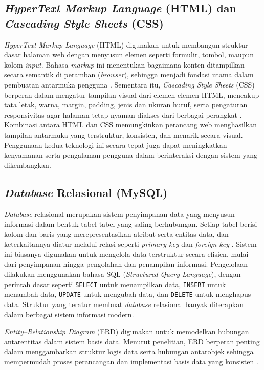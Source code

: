 \subsection{\textit{HyperText Markup Language} (HTML) dan \textit{Cascading Style Sheets} (CSS)} \label{II.HTMLCSS}
\textit{HyperText Markup Language} (HTML) digunakan untuk membangun struktur dasar halaman web dengan menyusun elemen seperti formulir, tombol, maupun kolom \textit{input}. Bahasa \textit{markup} ini menentukan bagaimana konten ditampilkan secara semantik di peramban (\textit{browser}), sehingga menjadi fondasi utama dalam pembuatan antarmuka pengguna \cite{jain2024modern}. Sementara itu, \textit{Cascading Style Sheets} (CSS) berperan dalam mengatur tampilan visual dari elemen-elemen HTML, mencakup tata letak, warna, margin, padding, jenis dan ukuran huruf, serta pengaturan responsivitas agar halaman tetap nyaman diakses dari berbagai perangkat \cite{jain2024modern}. Kombinasi antara HTML dan CSS memungkinkan perancang web menghasilkan tampilan antarmuka yang terstruktur, konsisten, dan menarik secara visual. Penggunaan kedua teknologi ini secara tepat juga dapat meningkatkan kenyamanan serta pengalaman pengguna dalam berinteraksi dengan sistem yang dikembangkan.\par

\subsection{\textit{Database} Relasional (MySQL)} \label{II.MySQL}
\textit{Database} relasional merupakan sistem penyimpanan data yang menyusun informasi dalam bentuk tabel-tabel yang saling berhubungan. Setiap tabel berisi kolom dan baris yang merepresentasikan atribut serta entitas data, dan keterkaitannya diatur melalui relasi seperti \textit{primary key} dan \textit{foreign key} \cite{esakkirajan2016fundamentals}. Sistem ini biasanya digunakan untuk mengelola data terstruktur secara efisien, mulai dari penyimpanan hingga pengolahan dan penampilan informasi. Pengelolaan dilakukan menggunakan bahasa SQL (\textit{Structured Query Language}), dengan perintah dasar seperti \texttt{SELECT} untuk menampilkan data, \texttt{INSERT} untuk menambah data, \texttt{UPDATE} untuk mengubah data, dan \texttt{DELETE} untuk menghapus data. Struktur yang teratur membuat \textit{database} relasional banyak diterapkan dalam berbagai sistem informasi modern.\par

\textit{Entity--Relationship Diagram} (ERD) digunakan untuk memodelkan hubungan antarentitas dalam sistem basis data. Menurut penelitian, ERD berperan penting dalam menggambarkan struktur logis data serta hubungan antarobjek sehingga mempermudah proses perancangan dan implementasi basis data yang konsisten \cite{song1995comparative}.\par


